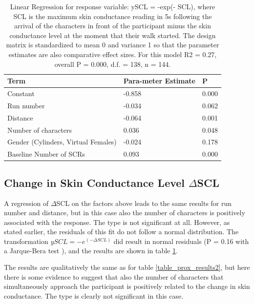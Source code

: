 \documentclass[
		twoside,openright,titlepage,numbers=noenddot,manychapters,
		headinclude,%
                footinclude=false,cleardoublepage=empty,
                BCOR=5mm,
		fontsize=11pt, %
                 enabledeprecatedfontcommands]{scrreprt}
\begin{document}
\begin{table}[tb]
\caption{Linear Regression for response variable:  ySCL = -exp(- SCL), where  SCL is the maximum skin conductance reading in 5s following the arrival of the characters in front of the participant minus the skin conductance level at the moment that their walk started. The design matrix is standardized to mean 0 and variance 1 so that the parameter estimates are also comparative effect sizes. 
For this model R2 = 0.27, overall P = 0.000, d.f. = 138, n = 144. 
}
\centering
\begin{tabular*}{0.90\textwidth}{ p{}  p{} p{}}
\\
\hline\hline
\textbf{Term} & \textbf{Para-meter Estimate} & \textbf{P}\\
\hline
Constant	& -0.858	& 0.000 \\
Run number	& -0.034	& 0.062 \\
Distance	& -0.064	& 0.001 \\
Number of characters	& 0.036 &	0.048 \\
Gender (Cylinders, Virtual Females)&	-0.024	& 0.178 \\
Baseline Number of SCRs	& 0.093	& 0.000\\
[1ex]
\hline
\end{tabular*}
\label{table_prox_results3}
\end{table}

\subsection{Change in Skin Conductance Level $\Delta$SCL}

A regression of  $\Delta$SCL on the factors above leads to the same results for run number and distance, but in this case also the number of characters is positively associated with the response. The type is not significant at all. However, as stated earlier, the residuals of this fit do not follow a normal distribution. The transformation %
$ySCL = -  e^{(-\Delta SCL)}$  did result in normal residuals (P = 0.16 with a Jarque-Bera test \cite[]{jarque1980efficient}), and the results are shown in table \ref{table_prox_results3}.

The results are qualitatively the same as for  table \ref{table_prox_results2}, but here there is some evidence to suggest that also the number of characters that simultaneously approach the participant is positively related to the change in skin conductance. The type is clearly not significant in this case.
\end{document}
